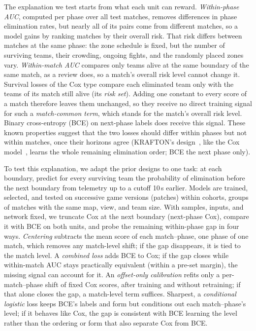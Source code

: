 \documentclass[sigconf,anonymous]{acmart}
\begin{document}
The explanation we test starts from what each unit can reward. \emph{Within-phase AUC}, computed per phase over all test matches, removes differences in phase elimination rates, but nearly all of its pairs come from different matches, so a model gains by ranking matches by their overall risk. That risk differs between matches at the same phase: the zone schedule is fixed, but the number of surviving teams, their crowding, ongoing fights, and the randomly placed zones vary. \emph{Within-match AUC} compares only teams alive at the same boundary of the same match, as a review does, so a match's overall risk level cannot change it. Survival losses of the Cox type compare each eliminated team only with the teams of its match still alive (its \emph{risk set}). Adding one constant to every score of a match therefore leaves them unchanged, so they receive no direct training signal for such a \emph{match-common term}, which stands for the match's overall risk level. Binary cross-entropy (BCE) on next-phase labels does receive this signal. These known properties suggest that the two losses should differ within phases but not within matches, once their horizons agree (KRAFTON's design~\cite{KRAFTON}, like the Cox model~\cite{Cox72}, learns the whole remaining elimination order; BCE the next phase only).

To test this explanation, we adapt the prior designs to one task: at each boundary, predict for every surviving team the probability of elimination before the next boundary from telemetry up to a cutoff 10\,s earlier. Models are trained, selected, and tested on successive game versions (patches) within cohorts, groups of matches with the same map, view, and team size. With samples, inputs, and network fixed, we truncate Cox at the next boundary (next-phase Cox), compare it with BCE on both units, and probe the remaining within-phase gap in four ways. \emph{Centering} subtracts the mean score of each match--phase, one phase of one match, which removes any match-level shift; if the gap disappears, it is tied to the match level. A \emph{combined loss} adds BCE to Cox; if the gap closes while within-match AUC stays practically equivalent (within a pre-set margin), the missing signal can account for it. An \emph{offset-only calibration} refits only a per-match--phase shift of fixed Cox scores, after training and without retraining; if that alone closes the gap, a match-level term suffices. Sharpest, a \emph{conditional logistic} loss keeps BCE's labels and form but conditions out each match--phase's level; if it behaves like Cox, the gap is consistent with BCE learning the level rather than the ordering or form that also separate Cox from BCE.
\end{document}

